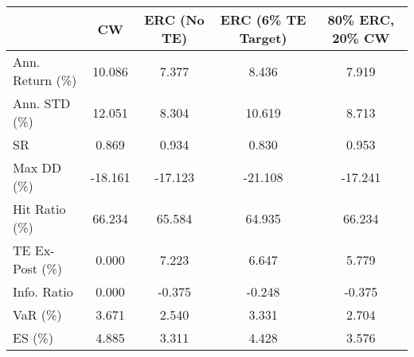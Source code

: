 \begin{tabular}{lcccc}
\toprule
{} &      CW &  ERC (No TE) &   ERC (6\% TE Target) &  80\% ERC, 20\% CW \\
\midrule
Ann. Return (\%) &  10.086 &        7.377 &                8.436 &            7.919 \\
Ann. STD (\%)    &  12.051 &        8.304 &               10.619 &            8.713 \\
SR              &   0.869 &        0.934 &                0.830 &            0.953 \\
Max DD (\%)      & -18.161 &      -17.123 &              -21.108 &          -17.241 \\
Hit Ratio (\%)   &  66.234 &       65.584 &               64.935 &           66.234 \\
TE Ex-Post (\%)  &   0.000 &        7.223 &                6.647 &            5.779 \\
Info. Ratio     &   0.000 &       -0.375 &               -0.248 &           -0.375 \\
VaR (\%)         &   3.671 &        2.540 &                3.331 &            2.704 \\
ES (\%)          &   4.885 &        3.311 &                4.428 &            3.576 \\
\bottomrule
\end{tabular}
